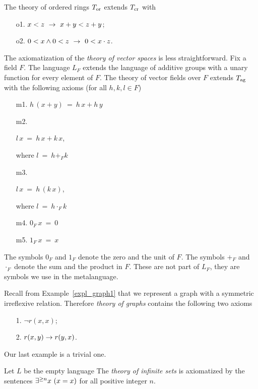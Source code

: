 \begin{example}
The theory of ordered rings $T_{\rm or}$ extends $T_{\rm cr}$ with
\begin{itemize}
\item[o1.] $x<z\ \rightarrow\ x+y<z+y$;
\item[o2.] $0<x \wedge 0<z\ \rightarrow\ 0<x\cdot z$.
\end{itemize}
\end{example}

\begin{example}\label{ex_ax_vect_sp}
The axiomatization of the \emph{theory of vector spaces\/} is less straightforward.
Fix a field $F$.
%
The language $L_F$ extends the language of additive groups with a unary function for every element of $F$.
The theory of vector fields over $F$ extends $T_{\rm ag}$ with the following axioms (for all $h,k,l\in F$)
\begin{itemize}
\item[m1.] $h\,(x+y)\ =\ h\,x+h\,y$
\item[m2.] \parbox{25ex}{$l\,x\ =\ h\,x+k\,x$,} where $l\ =\ h+_Fk$
\item[m3.] \parbox{25ex}{$l\,x\ =\ h\,(k\,x)$,} where $l\ =\ h\cdot_Fk$
\item[m4.] $0_F\,x\ =\ 0$
\item[m5.] $1_F\,x\ =\ x$
\end{itemize}
The symbols $0_F$ and $1_F$ denote the zero and the unit of $F$.
The symbols $+_F$ and $\cdot_F$ denote the sum and the product in $F$.
These are not part of $L_F$, they are symbols we use in the metalanguage.
\end{example}

\begin{example}\label{expl_Tgraphs}
Recall from Example~\ref{expl_graph1} that we represent a graph with a symmetric irreflexive relation.
Therefore \emph{theory of graphs\/} contains the following two axioms

\begin{itemize}
\item[1.] $\neg r(x,x)$;
\item[2.] $r(x,y)\rightarrow r(y,x)$.
\end{itemize}
\end{example}

Our last example is a trivial one.

\begin{example}
Let $L$ be the empty language The \emph{theory of infinite sets\/} is axiomatized by the sentences $\E^{\ge n} x\ (x=x)$ for all positive integer $n$.
\end{example}


